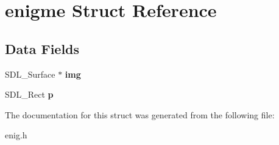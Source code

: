 \hypertarget{structenigme}{}\section{enigme Struct Reference}
\label{structenigme}
\subsection*{Data Fields}
\begin{DoxyCompactItemize}
\item 
\mbox{\label{structenigme_ac5c2141e5f8c366ff16d1fad83ee3e54}} 
S\+D\+L\+\_\+\+Surface $\ast$ {\bfseries img}
\item 
\mbox{\label{structenigme_a1ecc3fa572d2c308e1aecacf74fd1ec0}} 
S\+D\+L\+\_\+\+Rect {\bfseries p}
\end{DoxyCompactItemize}


The documentation for this struct was generated from the following file\+:\begin{DoxyCompactItemize}
\item 
enig.\+h\end{DoxyCompactItemize}
